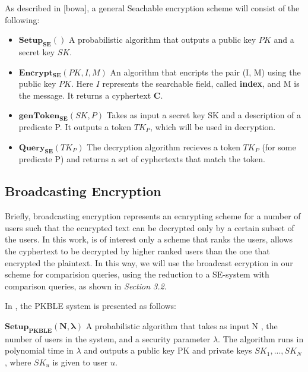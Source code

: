 \documentclass[a4paper, 12pt, oneside]{article}
\begin{document}
As described in [bowa], a general Seachable encryption scheme will consist of the following:\\

\begin{itemize}
\item $\mathbf{Setup_{SE}}()$ A probabilistic algorithm that outputs a public key $PK$ and a secret key $SK$.
\item $\mathbf{Encrypt_{SE}}(PK, I, M)$ An algorithm that encripts the pair (I, M) using the public key $PK$. Here $I$ represents the searchable field, called \textbf{index}, and M is the message. It returns a cyphertext \textbf{C}.
\item $\mathbf{genToken_{SE}}(SK, P)$ Takes as input a secret key SK and a description of a predicate P. It outputs a token \textbf{$TK_P$}, which will be used in decryption.
\item $\mathbf{Query_{SE}}(TK_P)$ The decryption algorithm recieves a token $TK_P$ (for some predicate P) and returns a set of cyphertexts that match the token.
\end{itemize}
\bigskip
%
%
%
%
%
\subsection{Broadcasting Encryption}

	Briefly, broadcasting encryption represents an ecnrypting scheme for a number of users such that the ecnrypted text can be decrypted only by a certain subset of the users. In this work, is of interest only a scheme that ranks the users, allows the cyphertext to be decrypted by higher ranked users than the one that encrypted the plaintext. In this way, we will use the broadcast ecryption in our scheme for comparision queries, using the reduction to a SE-system with comparison queries, as shown in \textit{Section 3.2}.

\bigskip

In \cite{bowa}, the PKBLE system is presented as follows:

\bigskip


\textit{$\mathbf{Setup_{PKBLE}(N, \lambda)}$} 
A probabilistic algorithm that takes as input N , the number of users in the
system, and a security parameter $\lambda$. The algorithm runs in polynomial time in $\lambda$ and outputs
a public key PK and private keys $SK_1 , . . . , SK_N$ , where $SK_u$ is given to user $u$.
\end{document}
